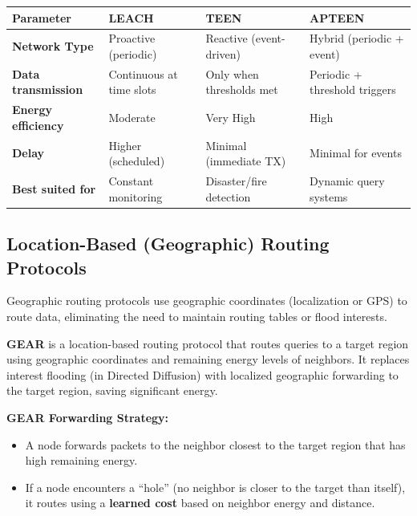 \documentclass[12pt,a4paper]{article}
\renewcommand{\arraystretch}{1.45}
\begin{document}
\par\noindent
{\renewcommand{\arraystretch}{1.4}%
\begin{tabularx}{\linewidth}{|B{2.8cm}|Y|Y|Y|}
\hline
\textbf{Parameter} & \textbf{LEACH} & \textbf{TEEN} & \textbf{APTEEN} \\
\hline
\textbf{Network Type} & Proactive (periodic) & Reactive (event-driven) & Hybrid (periodic + event) \\
\hline
\textbf{Data transmission} & Continuous at time slots & Only when thresholds met & Periodic + threshold triggers \\
\hline
\textbf{Energy efficiency} & Moderate & Very High & High \\
\hline
\textbf{Delay} & Higher (scheduled) & Minimal (immediate TX) & Minimal for events \\
\hline
\textbf{Best suited for} & Constant monitoring & Disaster/fire detection & Dynamic query systems \\
\hline
\end{tabularx}}

\subsection{Location-Based (Geographic) Routing Protocols}

Geographic routing protocols use geographic coordinates (localization or GPS) to route data, eliminating the need to maintain routing tables or flood interests.

\begin{tcolorbox}[defbox, title={\textbf{GEAR (Geographical and Energy-Aware Routing) --- Definition}}]
\textbf{GEAR} is a location-based routing protocol that routes queries to a target region using geographic coordinates and remaining energy levels of neighbors. It replaces interest flooding (in Directed Diffusion) with localized geographic forwarding to the target region, saving significant energy.
\end{tcolorbox}

\textbf{GEAR Forwarding Strategy:}
\begin{itemize}[leftmargin=*, itemsep=2pt]
  \item A node forwards packets to the neighbor closest to the target region that has high remaining energy.
  \item If a node encounters a ``hole'' (no neighbor is closer to the target than itself), it routes using a \textbf{learned cost} based on neighbor energy and distance.
\end{itemize}
\end{document}
